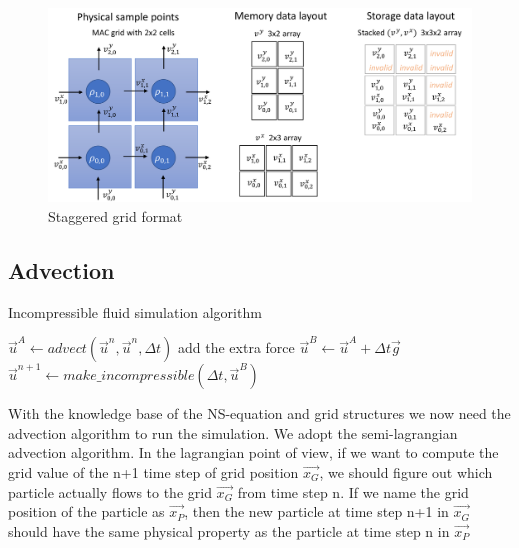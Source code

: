 \documentclass[a4paper,12pt,twoside]{report}
\begin{document}
\begin{figure}[h]
\centering
\includegraphics[width=\textwidth]{Staggered.png}
\caption{Staggered grid format \cite{staggeredform}}
\end{figure}

\subsection{Advection}
\begin{algorithm}
	\caption{Incompressible fluid simulation algorithm}
\begin{algorithmic}
	\STATE $\vec{u}^{A} \gets advect(\vec{u}^{n}, \vec{u}^{n}, \Delta t)$
	\STATE add the extra force $\vec{u}^{B} \gets \vec{u}^{A} + \Delta t\vec{g}$
	\STATE $\vec{u}^{n+1} \gets make\_incompressible(\Delta t, \vec{u}^{B})$
	\ENDFOR
\end{algorithmic}
\end{algorithm}

With the knowledge base of the NS-equation and grid structures we now need the advection algorithm to run the simulation. We adopt the semi-lagrangian advection algorithm. In the lagrangian point of view, if we want to compute the grid value of the n+1 time step of grid position $\vec{x_G}$, we should figure out which particle actually flows to the grid $\vec{x_G}$ from time step n. If we name the grid position of the particle as $\vec{x_P}$, then the new particle at time step n+1 in $\vec{x_G}$ should have the same physical property as the particle at time step n in $\vec{x_P}$
\end{document}
